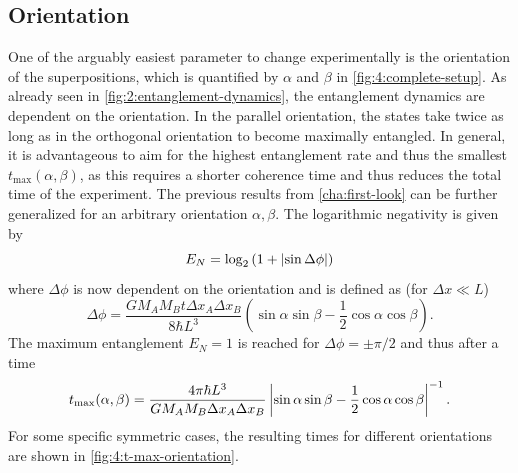 \subsection{Orientation}
One of the arguably easiest parameter to change experimentally is the orientation of the superpositions, which is quantified by $\alpha$ and $\beta$ in \cref{fig:4:complete-setup}.
As already seen in \cref{fig:2:entanglement-dynamics}, the entanglement dynamics are dependent on the orientation.
In the parallel orientation, the states take twice as long as in the orthogonal orientation to become maximally entangled.
In general, it is advantageous to aim for the highest entanglement rate and thus the smallest $t_\mathrm{max}(\alpha, \beta)$, as this requires a shorter coherence time and thus reduces the total time of the experiment.
The previous results from \cref{cha:first-look} can be further generalized for an arbitrary orientation $\alpha, \beta$. The logarithmic negativity is given by
\begin{equation}
  E_N = \log_2\left(1+\left\lvert\sin\Delta\phi\right\rvert\right)
\end{equation}
where $\Delta\phi$ is now dependent on the orientation and is defined as (for $\Delta x \ll L$)
\begin{equation}\label{eq:4:delta-phi}
  \Delta \phi = \frac{G M_A M_B t \Delta x_A \Delta x_B}{8\hbar L^3} \left(\sin\alpha\sin\beta-\frac{1}{2}\cos\alpha\cos\beta\right) .
\end{equation}
The maximum entanglement $E_N=1$ is reached for $\Delta\phi = \pm \pi/2$ and thus after a time
\begin{equation}\label{eq:4:t-max}
  t_\mathrm{max}(\alpha,\beta) = \frac{4\pi \hbar L^3}{G M_A M_B \Delta x_A \Delta x_B}\left\lvert\sin\alpha\sin\beta - \frac{1}{2}\cos\alpha\cos\beta\right\rvert^{-1}.
\end{equation}
For some specific symmetric cases, the resulting times for different orientations are shown in \cref{fig:4:t-max-orientation}.
